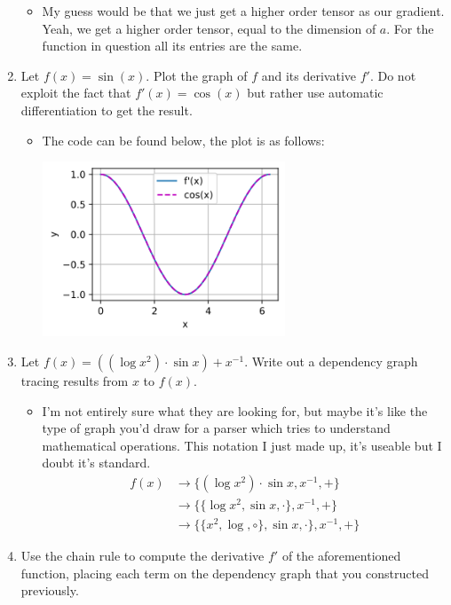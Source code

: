 \documentclass{article}
\begin{document}
\begin{enumerate}
\begin{itemize}
		\item My guess would be that we just get a higher order tensor as our gradient. Yeah, we get a higher order tensor, equal to the dimension of $a$. For the function in question all its entries are the same.
	\end{itemize}
\item Let $f(x) = \sin(x)$. Plot the graph of $f$ and its derivative $f'$. Do not exploit the fact that $f'(x) = \cos(x)$ but rather use automatic differentiation to get the result.
	\begin{itemize}
		\item The code can be found below, the plot is as follows:
		\begin{center}
		\includegraphics[width=0.6\textwidth]{Images/2_5_4.png}
		\end{center}
	\end{itemize}
\item Let $f(x) = ((\log x^2) \cdot \sin x) + x^{-1}$. Write out a dependency graph tracing results from $x$ to $f(x)$.
	\begin{itemize}
		\item I'm not entirely sure what they are looking for, but maybe it's like the type of graph you'd draw for a parser which tries to understand mathematical operations. This notation I just made up, it's useable but I doubt it's standard.
		$$
		\begin{aligned}
		f(x) &\rightarrow \{(\log x^2) \cdot \sin x, x^{-1}, +\} \\
		&\rightarrow \{\{\log x^2, \sin x, \cdot\}, x^{-1}, +\} \\
		&\rightarrow \{\{x^2, \log, \circ\}, \sin x, \cdot\}, x^{-1}, +\}
		\end{aligned}
		$$
	\end{itemize}
\item Use the chain rule to compute the derivative $f'$ of the aforementioned function, placing each term on the dependency graph that you constructed previously.

\end{enumerate}
\end{document}
